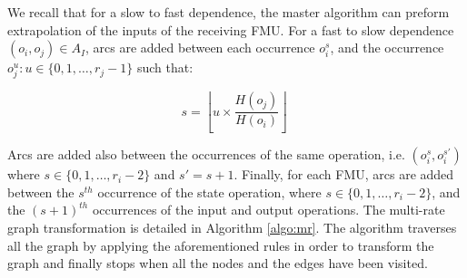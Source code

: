 We recall that for a slow to fast dependence, the master algorithm can preform extrapolation of the inputs of the receiving FMU. For a fast to slow dependence $(o_i,o_j) \in A_I$, arcs are added between each occurrence $o_i^s$, and the occurrence $o_j^u: u \in \{0,1, \dots ,r_j-1\}$ such that:

\begin{equation}
s = \left \lfloor{u \times \frac{H(o_j)}{H(o_i)}}\right \rfloor\;
\end{equation}

Arcs are added also between the occurrences of the same operation, i.e. $(o_i^s,o_i^{s'})$ where $s \in \{0,1, \dots ,r_i-2\}$ and $s' = s + 1$. Finally, for each FMU, arcs are added between the $s^{th}$ occurrence of the state operation, where $s \in \{0,1, \dots ,r_i-2\}$, and the $(s+1)^{th}$ occurrences of the input and output operations. The multi-rate graph transformation is detailed in Algorithm \ref{algo:mr}. The algorithm traverses all the graph by applying the aforementioned rules in order to transform the graph and finally stops when all the nodes and the edges have been visited.

